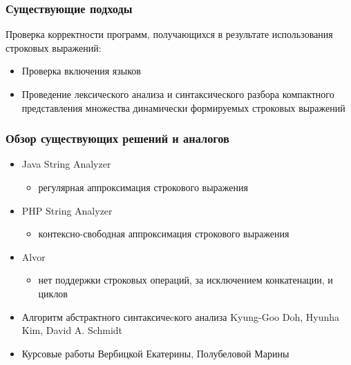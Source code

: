 \documentclass{beamer}
\begin{document}
\begin{frame}[fragile]
\transwipe[direction=90]
\frametitle{Существующие подходы}
Проверка корректности программ, получающихся в результате использования строковых выражений:
\begin{itemize}
	\item Проверка включения языков
	\item Проведение лексического анализа и синтаксического разбора компактного представления множества динамически формируемых строковых выражений
\end{itemize}	
\end{frame}


\begin{frame}
\transwipe[direction=90]
\frametitle{Обзор существующих решений и аналогов}
\begin{itemize}
\item Java String Analyzer
	\begin{itemize}
	\item регулярная аппроксимация строкового выражения
	\end{itemize}
	
\item PHP String Analyzer 
	\begin{itemize}
	\item контексно-свободная аппроксимация строкового выражения
	\end{itemize}
	
\item Alvor 
	\begin{itemize}
	\item нет поддержки строковых операций, за исключением конкатенации, и циклов
	\end{itemize}

\item Алгоритм абстрактного синтаксичеcкого анализа Kyung-Goo Doh, Hyunha Kim, David A. Schmidt

\item Курсовые работы Вербицкой Екатерины, Полубеловой Марины
\end{itemize}
\end{frame}
\end{document}

